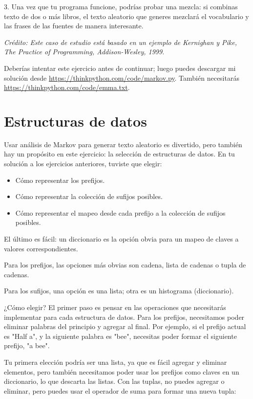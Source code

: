 3. Una vez que tu programa funcione, podrías probar una mezcla: si combinas texto de dos o más libros, el texto aleatorio que generes mezclará el vocabulario y las frases de las fuentes de manera interesante.

\textit{Crédito: Este caso de estudio está basado en un ejemplo de Kernighan y Pike, \textit{The Practice of Programming}, Addison-Wesley, 1999.}

Deberías intentar este ejercicio antes de continuar; luego puedes descargar mi solución desde \url{https://thinkpython.com/code/markov.py}. También necesitarás \url{https://thinkpython.com/code/emma.txt}.

\section{Estructuras de datos}

Usar análisis de Markov para generar texto aleatorio es divertido, pero también hay un propósito en este ejercicio: la selección de estructuras de datos. En tu solución a los ejercicios anteriores, tuviste que elegir:

\begin{itemize}
    \item Cómo representar los prefijos.
    \item Cómo representar la colección de sufijos posibles.
    \item Cómo representar el mapeo desde cada prefijo a la colección de sufijos posibles.
\end{itemize}

El último es fácil: un diccionario es la opción obvia para un mapeo de claves a valores correspondientes.

Para los prefijos, las opciones más obvias son cadena, lista de cadenas o tupla de cadenas.

Para los sufijos, una opción es una lista; otra es un histograma (diccionario).

¿Cómo elegir? El primer paso es pensar en las operaciones que necesitarás implementar para cada estructura de datos. Para los prefijos, necesitamos poder eliminar palabras del principio y agregar al final. Por ejemplo, si el prefijo actual es "Half a", y la siguiente palabra es "bee", necesitas poder formar el siguiente prefijo, "a bee".

Tu primera elección podría ser una lista, ya que es fácil agregar y eliminar elementos, pero también necesitamos poder usar los prefijos como claves en un diccionario, lo que descarta las listas. Con las tuplas, no puedes agregar o eliminar, pero puedes usar el operador de suma para formar una nueva tupla:

